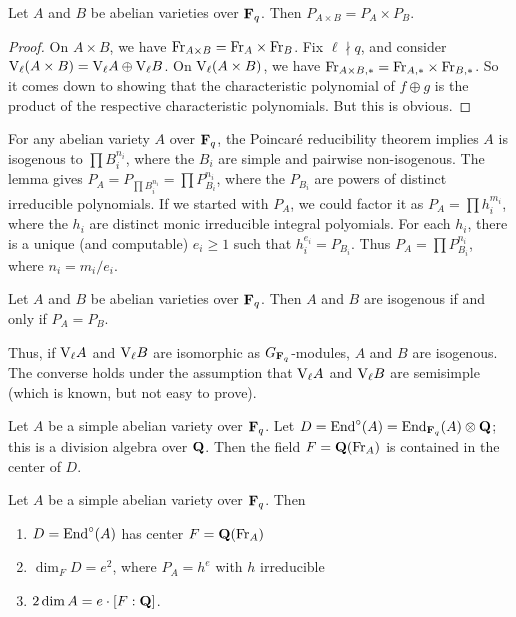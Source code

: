 
\begin{lemma}
Let $A$ and $B$ be abelian varieties over $\mathbf{F}_q$. Then 
$P_{A\times B}=P_A\times P_B$. 
\end{lemma}
\begin{proof}
On $A\times B$, we have $\mathrm{Fr}_{A\times B}=\mathrm{Fr}_A\times \mathrm{Fr}_B$. Fix 
$\ell\nmid q$, and consider $\mathrm{V}_\ell(A\times B)=\mathrm{V}_\ell A\oplus \mathrm{V}_\ell B$. On 
$\mathrm{V}_\ell(A\times B)$, we have 
$\mathrm{Fr}_{A\times B,\ast} = \mathrm{Fr}_{A,\ast}\times \mathrm{Fr}_{B,\ast}$. So it comes down 
to showing that the characteristic polynomial of $f\oplus g$ is the product of 
the respective characteristic polynomials. But this is obvious. 
\end{proof}

For any abelian variety $A$ over $\mathbf{F}_q$, the Poincar\'e reducibility theorem 
implies $A$ is isogenous to $\prod B_i^{n_i}$, where the $B_i$ are simple and 
pairwise non-isogenous. The lemma gives 
$P_A=P_{\prod B_i^{n_i}} = \prod P_{B_i}^{n_i}$, where the $P_{B_i}$ are powers 
of distinct irreducible polynomials. If we started with $P_A$, we could factor 
it as $P_A=\prod h_i^{m_i}$, where the $h_i$ are distinct monic irreducible 
integral polyomials. For each $h_i$, there is a unique (and computable) 
$e_i\geqslant 1$ such that $h_i^{e_i} = P_{B_i}$. Thus 
$P_A=\prod P_{B_i}^{n_i}$, where $n_i=m_i/e_i$. 

\begin{theorem}
Let $A$ and $B$ be abelian varieties over $\mathbf{F}_q$. Then $A$ and $B$ are 
isogenous if and only if $P_A=P_B$.
\end{theorem}

Thus, if $\mathrm{V}_\ell A$ and $\mathrm{V}_\ell B$ are isomorphic as 
$G_{\mathbf{F}_q}$-modules, $A$ and $B$ are isogenous. The converse holds under the 
assumption that $\mathrm{V}_\ell A$ and $\mathrm{V}_\ell B$ are semisimple (which is 
known, but not easy to prove). 

Let $A$ be a simple abelian variety over $\mathbf{F}_q$. Let 
$D=\operatorname{End}^\circ(A)=\operatorname{End}_{\mathbf{F}_q}(A)\otimes\mathbf{Q}$; this is a division algebra over 
$\mathbf{Q}$. Then the field $F=\mathbf{Q}(\mathrm{Fr}_A)$ is contained in the 
center of $D$. 

\begin{theorem}
Let $A$ be a simple abelian variety over $\mathbf{F}_q$. Then 
\begin{enumerate}
  \item $D=\operatorname{End}^\circ(A)$ has center $F=\mathbf{Q}(\mathrm{Fr}_A)$ 
  \item $\dim_F D = e^2$, where $P_A =h^e$ with $h$ irreducible
  \item $2\dim A = e\cdot [F:\mathbf{Q}]$. 
\end{enumerate}
\end{theorem}

